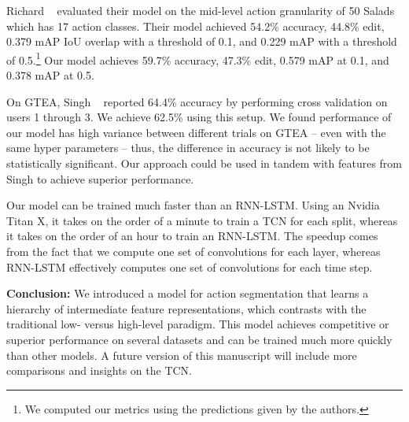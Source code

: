 \documentclass[10pt,twocolumn,letterpaper]{article}
\newcommand{\fakesubsection}[1]{\smallskip\noindent\textbf{#1:}}
\begin{document}
Richard \etal~\cite{richard_cvpr_2016} evaluated their model on the mid-level action granularity of 50 Salads which has 17 action classes. Their model achieved 54.2\% accuracy, 44.8\% edit, 0.379 mAP IoU overlap with a threshold of 0.1, and 0.229 mAP with a threshold of 0.5.\footnote{We computed our metrics using the predictions given by the authors.}
Our model achieves 59.7\% accuracy, 47.3\% edit, 0.579 mAP at 0.1, and 0.378 mAP at 0.5.

On GTEA, Singh \etal~\cite{singh_cvpr_2016b} reported 64.4\% accuracy by performing cross validation on users 1 through 3. We achieve 62.5\% using this setup. We found performance of our model has high variance between different trials on GTEA  -- even with the same hyper parameters -- thus, the difference in accuracy is not likely to be statistically significant. Our approach could be used in tandem with features from Singh \etal to achieve superior performance. 
 












Our model can be trained much faster than an RNN-LSTM. 
Using an Nvidia Titan X, it takes on the order of a minute to train a TCN for each split, whereas it takes on the order of an hour to train an RNN-LSTM.
The speedup comes from the fact that we compute one set of convolutions for each layer, whereas RNN-LSTM effectively computes one set of convolutions for each time step. 








\fakesubsection{Conclusion}
We introduced a model for action segmentation that learns a hierarchy of intermediate feature representations, which contrasts with the traditional low- versus high-level paradigm. This model achieves competitive or superior performance on several datasets and can be trained much more quickly than other models. 
A future version of this manuscript will include more comparisons and insights on the TCN. 














 








{\small


}
\end{document}
